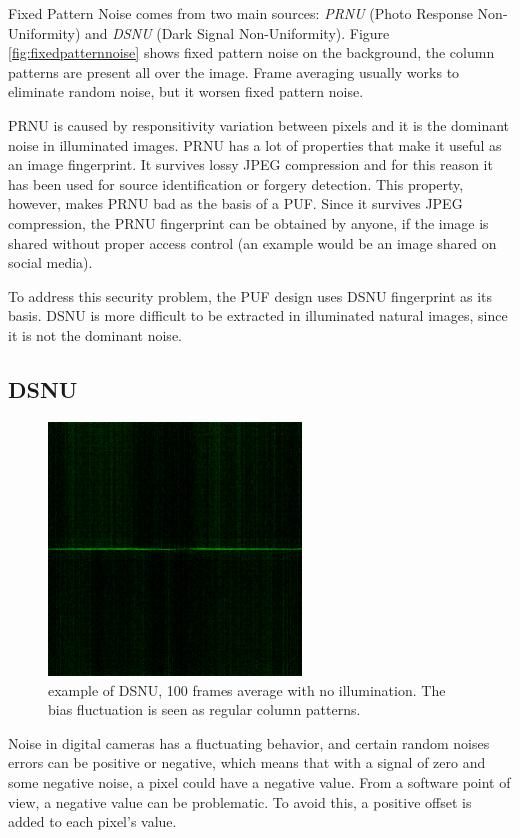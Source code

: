 Fixed Pattern Noise comes from two main sources: \textit{PRNU} (Photo Response Non-Uniformity) and \textit{DSNU} (Dark Signal Non-Uniformity).
Figure \ref{fig:fixedpatternnoise} shows fixed pattern noise on the background, the column patterns are present all over the image. Frame averaging usually works to eliminate random noise, but it worsen fixed pattern noise.

PRNU is caused by responsitivity variation between pixels and it is the dominant noise in illuminated images. PRNU has a lot of properties that make it useful as an image fingerprint.
It survives lossy JPEG compression and for this reason it has been used for source identification or forgery detection. This property, however, makes PRNU bad as the basis of a PUF.
Since it survives JPEG compression, the PRNU fingerprint can be obtained by anyone, if the image is shared without proper access control (an example would be an image shared on social media).

To address this security problem, the PUF design uses DSNU fingerprint as its basis. DSNU is more difficult to be extracted in illuminated natural images, since it is not the dominant noise.

\subsection{DSNU}
\begin{figure}[h!]                      
    \centering
    \includegraphics[width=0.6\textwidth]{images/DSNU.png}
    \caption{example of DSNU, 100 frames average with no illumination. The bias fluctuation is seen as regular column patterns. \cite{pattnoise}}
    \label{fig:dsnu}
\end{figure}

Noise in digital cameras has a fluctuating behavior, and certain random noises errors can be positive or negative, which means that with a signal of zero and some negative noise, a pixel could have a negative value.
From a software point of view, a negative value can be problematic. To avoid this, a positive offset is added to each pixel's value.

